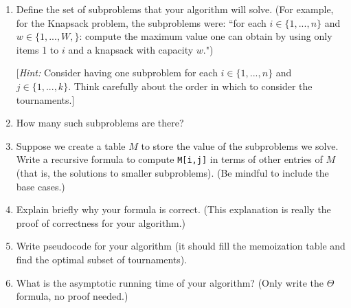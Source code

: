 \documentclass[11pt]{article}
\begin{document}
\begin{enumerate}
\begin{enumerate}
\begin{enumerate}
    
\item Define the set of subproblems that your algorithm will solve. (For example, for the Knapsack problem, the subproblems were: ``for each $i \in \{1,...,n\}$ and $w \in \{1,...,W,\}$: compute the maximum value one can obtain by using only items 1 to $i$ and a knapsack with capacity $w$.") 

[\textit{Hint:} Consider having one subproblem for each $i\in \{1,...,n\}$ and $j \in \{1,...,k\}$. Think carefully about the order in which to consider the tournaments.]

\item How many such subproblems are there?


\item Suppose we create a table $M$ to store the value of the subproblems we solve. Write a recursive formula to compute \texttt{M[i,j]} in terms of other entries of $M$ (that is, the solutions to smaller subproblems). 
(Be mindful to include the base cases.)

\item Explain briefly why your formula is correct. (This explanation is really the proof of correctness for your algorithm.)



\item Write pseudocode for your algorithm (it should fill the memoization table and find the optimal subset of tournaments).

 \item What is the asymptotic running time of your algorithm? (Only write the $\Theta$  formula, no proof needed.)


\end{enumerate}

\end{enumerate}


\end{enumerate}
\end{document}

